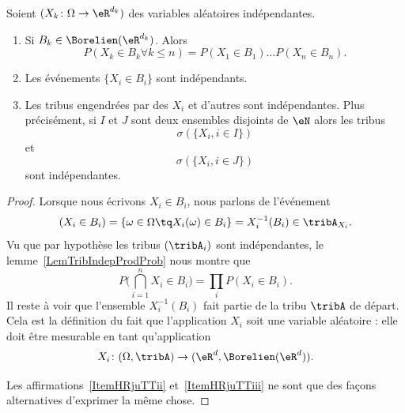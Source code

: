 \begin{proposition} \label{PropMLbfRTk}
	Soient \( (X_k\colon \Omega\to \eR^{d_k})\) des variables aléatoires indépendantes.
	\begin{enumerate}
		\item
		      Si \( B_k\in \Borelien(\eR^{d_k})\). Alors
		      \begin{equation}
			      P(X_k\in B_k\forall k\leq n)=P(X_1\in B_1)\ldots P(X_n\in B_n).
		      \end{equation}
		\item\label{ItemHRjuTTii}
		      Les événements \( \{   X_i\in B_i   \}\) sont indépendants.
		\item\label{ItemHRjuTTiii}
		      Les tribus engendrées par des \( X_i\) et d'autres sont indépendantes. Plus précisément, si \( I\) et \( J\) sont deux ensembles disjoints de \( \eN\) alors les tribus
		      \begin{equation}
			      \sigma(  \{ X_i,i\in I \}  )
		      \end{equation}
		      et
		      \begin{equation}
			      \sigma(  \{ X_i,i\in J \}  )
		      \end{equation}
		      sont indépendantes.
	\end{enumerate}

\end{proposition}

\begin{proof}
	Lorsque nous écrivons \( X_i\in B_i\), nous parlons de l'événement
	\begin{equation}
		(X_i\in B_i)=\{ \omega\in\Omega\tq X_i(\omega)\in B_i \}=X_i^{-1}(B_i)\in \tribA_{X_i}.
	\end{equation}
	Vu que par hypothèse les tribus \( (\tribA_i)\) sont indépendantes, le lemme~\ref{LemTribIndepProdProb} nous montre que
	\begin{equation}
		P\big( \bigcap_{i=1}^nX_i\in B_i \big)=\prod_iP(X_i\in B_i).
	\end{equation}
	Il reste à voir que l'ensemble \( X_i^{-1}(B_i)\) fait partie de la tribu \( \tribA\) de départ. Cela est la définition du fait que l'application \( X_i\) soit une variable aléatoire : elle doit être mesurable en tant qu'application
	\begin{equation}
		X_i\colon (\Omega,\tribA)\to (\eR^d,\Borelien(\eR^d)).
	\end{equation}

	Les affirmations~\ref{ItemHRjuTTii} et~\ref{ItemHRjuTTiii} ne sont que des façons alternatives d'exprimer la même chose.
\end{proof}

